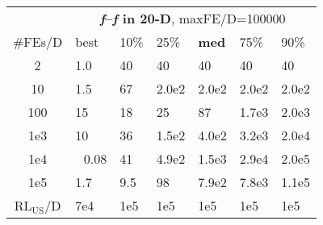 \begin{tabular}{c|llllll}
 & \multicolumn{6}{|c}{\textbf{\textit{f}\raisebox{-0.35ex}{1}--\textit{f}\raisebox{-0.35ex}{55} in 20-D}, maxFE/D=100000}\\
\#FEs/D & best & 10\% & 25\% & \textbf{med} & 75\% & 90\%\\
2 & \hspace*{1ex}1.0 & 40 & 40 & 40 & 40 & 40\\
10 & \hspace*{1ex}1.5 & 67 & 2.0e2 & 2.0e2 & 2.0e2 & 2.0e2\\
100 & 15 & 18 & 25 & 87 & 1.7e3 & 2.0e3\\
1e3 & 10 & 36 & 1.5e2 & 4.0e2 & 3.2e3 & 2.0e4\\
1e4 & ~\,0.08 & 41 & 4.9e2 & 1.5e3 & 2.9e4 & 2.0e5\\
1e5 & \hspace*{1ex}1.7 & \hspace*{1ex}9.5 & 98 & 7.9e2 & 7.8e3 & 1.1e5\\
$\text{RL}_{\text{US}}$/D & 7e4 & 1e5 & 1e5 & 1e5 & 1e5 & 1e5
\end{tabular}
